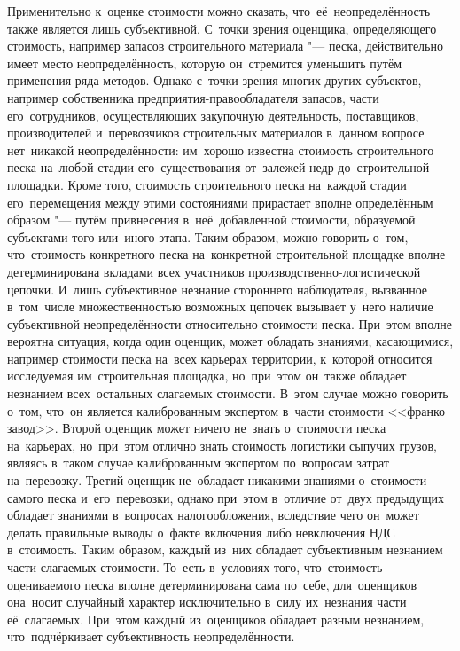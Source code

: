 \documentclass[]{scrartcl}
\begin{document}
Применительно к~оценке стоимости можно сказать, что~её~неопределённость также является лишь субъективной. С~точки зрения оценщика, определяющего стоимость, например запасов строительного материала "--- песка, действительно имеет место неопределённость, которую он~стремится уменьшить путём применения ряда методов. Однако с~точки зрения многих других субъектов, например собственника предприятия-правообладателя запасов, части его~сотрудников, осуществляющих закупочную деятельность, поставщиков, производителей и~перевозчиков строительных материалов в~данном вопросе нет~никакой неопределённости: им~хорошо известна  стоимость строительного песка на~любой стадии его~существования от~залежей недр до~строительной площадки. Кроме того, стоимость строительного песка на~каждой стадии его~перемещения между этими состояниями прирастает вполне определённым образом "--- путём привнесения в~неё~добавленной стоимости, образуемой субъектами того или~иного этапа. Таким образом, можно говорить о~том, что~стоимость конкретного песка на~конкретной строительной площадке вполне детерминирована вкладами всех участников производственно-логистической цепочки. И~лишь субъективное незнание стороннего наблюдателя, вызванное в~том~числе множественностью возможных цепочек вызывает у~него наличие субъективной неопределённости относительно стоимости песка. При~этом вполне вероятна ситуация, когда один оценщик, может обладать знаниями, касающимися, например стоимости песка на~всех карьерах территории, к~которой относится исследуемая им~строительная площадка, но~при~этом он~также обладает незнанием всех~остальных слагаемых стоимости. В~этом случае можно говорить о~том, что~он является калиброванным экспертом в~части стоимости <<франко завод>>. Второй оценщик может ничего не~знать о~стоимости песка на~карьерах, но~при~этом отлично знать стоимость логистики сыпучих грузов, являясь в~таком случае калиброванным экспертом по~вопросам затрат на~перевозку. Третий оценщик не~обладает никакими знаниями о~стоимости самого песка и~его~перевозки, однако при~этом в~отличие от~двух предыдущих обладает знаниями в~вопросах налогообложения, вследствие чего он~может делать правильные выводы о~факте включения либо невключения НДС в~стоимость. Таким образом, каждый из~них обладает субъективным незнанием части слагаемых стоимости. То~есть в~условиях того, что~стоимость оцениваемого песка вполне детерминирована сама по~себе, для~оценщиков она~носит случайный характер исключительно в~силу их~незнания части её~слагаемых. При~этом каждый из~оценщиков обладает разным незнанием, что~подчёркивает субъективность неопределённости.
\end{document}
